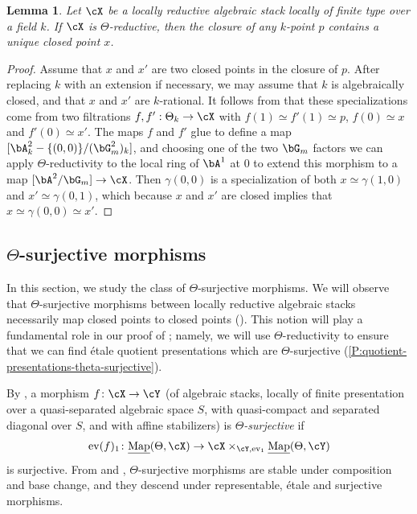 \documentclass[a4paper]{amsart}
\numberwithin{equation}{section}
\theoremstyle{plain}
\newtheorem{lem}[thm]{Lemma}
\theoremstyle{definition}
\DeclareMathOperator{\ev}{ev}
\newcommand{\uMap}{\underline{{\rm Map}}}
\newcommand{\co}{\colon}
\begin{document}
\begin{lem} \label{L:unique_closed_point}
Let $\cX$ be a locally reductive algebraic stack locally of finite type over a field $k$. If $\cX$ is $\Theta$-reductive, then the closure of any $k$-point $p$ contains a unique closed point $x$.
\end{lem}
\begin{proof}
Assume that $x$ and $x'$ are two closed points in the closure of $p$. After replacing $k$ with an extension if necessary, we may assume that $k$ is {algebraically closed}, and that $x$ and $x'$ are $k$-rational.  It follows from  that these specializations come from two filtrations $f,f' : \Theta_k \to \cX$ with $f(1) \simeq f'(1) \simeq p$, $f(0) \simeq x$ and $f'(0) \simeq x'$. The maps $f$ and $f'$ glue to define a map $[\bA^2_k - \{(0,0)\} / (\bG_m^2)_k]$, 
and choosing one of the two $\bG_m$ factors we can apply $\Theta$-reductivity {to the local ring of $\bA^1$ at $0$} to extend this morphism to a map $[\bA^2/\bG_m]\to \cX$. Then $\gamma(0,0)$ is a specialization of both $x \simeq \gamma(1,0)$ and $x' \simeq \gamma(0,1)$, which because $x$ and $x'$ are closed implies that $x \simeq \gamma(0,0) \simeq x'$.
\end{proof}


\subsection{\texorpdfstring{$\Theta$}{Theta}-surjective morphisms} \label{S:theta-surjective}
In this section, we study the class of $\Theta$-surjective morphisms.  We will observe that $\Theta$-surjective morphisms between locally reductive algebraic stacks necessarily map closed points to closed points ().  This notion will play a fundamental role in our proof of ; namely, we will use  $\Theta$-reductivity to ensure that we can find \'etale quotient presentations which are $\Theta$-surjective (\eqref{P:quotient-presentations-theta-surjective}).
 
 
By , a morphism $f \co \cX \to \cY$ (of algebraic stacks, locally of finite presentation over a quasi-separated algebraic space $S$, with quasi-compact and separated diagonal over $S$, and with affine stabilizers) is \emph{$\Theta$-surjective} if
$$\ev(f)_1 \co \uMap(\Theta,\cX)  \to \cX \times_{\cY, \ev_1} \uMap(\Theta,\cY)$$
is surjective.  From  and , $\Theta$-surjective morphisms are stable under composition and base change, and they descend under representable, \'etale and surjective morphisms.
\end{document}
